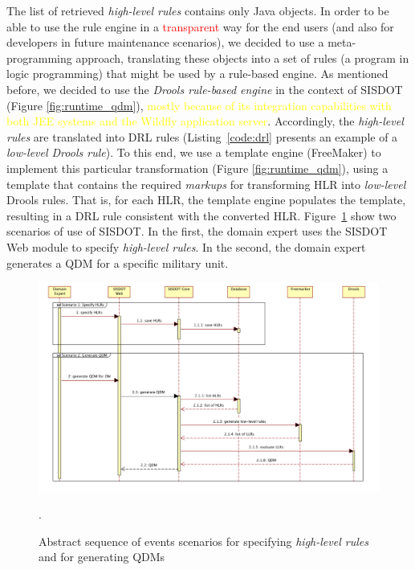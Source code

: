 \documentclass[AMA,STIX1COL]{WileyNJD-v2}
\newcommand{\callers}{\emph{high-level rules}\xspace}
\newcommand{\shc}{HLR\xspace}
\begin{document}
The list of retrieved \callers contains only Java objects. In order to be able to use the rule engine in a \textcolor{red}{transparent} way for the end users (and also for developers in future maintenance scenarios), we decided to use a meta-programming approach, translating these objects into a set of rules (a program in logic programming) that might be used by a rule-based engine. As mentioned before, we decided to use the \emph{Drools rule-based engine} in the context of SISDOT (Figure \ref{fig:runtime_qdm}), \textcolor{yellow}{mostly because of its integration capabilities with both JEE systems and the Wildfly application server}. Accordingly, the \callers are translated into DRL rules (Listing~\ref{code:drl} presents an example of a \emph{low-level Drools rule}). To this end, we use a template engine (FreeMaker) to implement this particular transformation (Figure \ref{fig:runtime_qdm}), using a template that contains the required \emph{markups} for transforming \shc into \emph{low-level} Drools rules. That is, for each \shc, the template engine populates the template, resulting in a DRL rule consistent with the converted \shc. Figure~\ref{fig:seq-diagram} show two scenarios of use of SISDOT. In the first, the domain expert uses the SISDOT Web module to specify \callers. In the second, the domain expert generates a QDM for a specific military unit.

\begin{figure}[htb]
  \includegraphics[scale=0.6]{img/diagram.pdf}
  \caption{Abstract sequence of
    events scenarios for specifying \callers and for generating QDMs}.
  \label{fig:seq-diagram} 
\end{figure}

\end{document}
